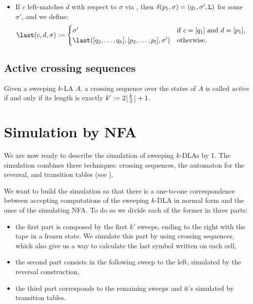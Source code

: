 \begin{defn}
\begin{itemize}
\begin{equation*}
		      \end{equation*}
		\item If $c$ left-matches $d$ with respect to $\sigma$ via , then $\delta(p_1,\sigma)=(q_1,\sigma',\mathtt L)$ for some $\sigma'$, and we define:
		      \begin{equation*}
			      \last(c,d,\sigma):=\begin{cases}
				      \sigma'                                        & \text{if } c=[q_1] \text{ and } d=[p_1],~~ \\
				      \last([q_2,\dots,q_h],[p_2,\dots,p_l],\sigma') & \text{otherwise}.
			      \end{cases}
		      \end{equation*}
	\end{itemize}
\end{defn}


\subsection{Active crossing sequences}
\begin{defn}
	Given a sweeping $k$-LA $A$, a crossing sequence over the states of $A$ is called \emph{active} if and only if its length is exactly $k':=2\lfloor \frac{k}{2} \rfloor+1$.
\end{defn}



\section{Simulation by NFA}\label{sec:swkdla-to-NFA}
We are now ready to describe the simulation of sweeping $k$-DLAs by 1\NFAs.
The simulation combines three techniques: crossing sequences, the automaton for the reversal, and transition tables (see ).

We want to build the simulation so that there is a one-to-one correspondence between accepting computations of the sweeping $k$-DLA in normal form and the ones of the simulating NFA.
To do so we divide each of the former in three parts:
\begin{itemize}
	\item the first part is composed by the first $k'$ sweeps, ending to the right with the tape in a frozen state. We simulate this part by using crossing sequences, which also give us a way to calculate the last symbol written on each cell,
	\item the second part consists in the following sweep to the left, simulated by the reversal construction,
	\item the third part corresponds to the remaining sweeps and it's simulated by transition tables.
\end{itemize}

